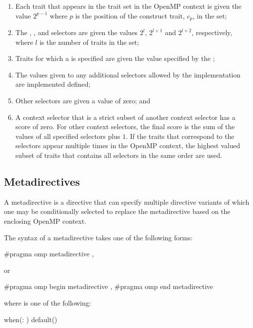 \begin{enumerate}
\item Each trait that appears in the  trait set in the OpenMP context 
      is given the value $2^{p-1}$ where $p$ is the position of the construct trait,
      $c_{p}$, in the set;
\item The , , and  selectors are given the
      values $2^{l}$, $2^{l+1}$ and $2^{l+2}$, respectively, where $l$ is 
      the number of traits in the  set;
\item Traits for which a  is specified are given the value specified by the
       ; 
\item The values given to any additional selectors allowed by the implementation 
      are implemented defined;
\item Other selectors are given a value of zero; and
\item A context selector that is a strict subset of another context selector
      has a score of zero. For other context selectors, the final score is the
      sum of the values of all specified selectors plus $1$. If the traits
      that correspond to the  selectors appear multiple times 
      in the OpenMP context, the highest valued subset of traits that contains 
      all selectors in the same order are used.
\end{enumerate}



\subsection{Metadirectives}
\label{subsec:Metadirective Meta-Directive}
\summary
A metadirective is a directive that can specify multiple directive variants
of which one may be conditionally selected to replace the metadirective based
on the enclosing OpenMP context.

\syntax
\begin{ccppspecific}
The syntax of a metadirective takes one of the
following forms:
\begin{ompcPragma}
#pragma omp metadirective \plc{[clause[ [},\plc{] clause] ... ] new-line}
\end{ompcPragma}
or
\begin{ompcPragma}
#pragma omp begin metadirective \plc{[clause[ [},\plc{] clause] ... ] new-line}
#pragma omp end metadirective
\end{ompcPragma}


\begin{samepage}
where  is one of the following:
\begin{indentedcodelist}
when(: )
default()
\end{indentedcodelist}
\end{samepage}

\end{ccppspecific}


